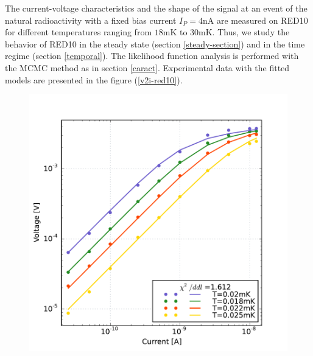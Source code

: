 The current-voltage characteristics and the shape of the signal at an event of the natural radioactivity with a fixed bias current $I_P=4$nA are measured on RED10 for different temperatures ranging from $18$mK to $30$mK. Thus, we study the behavior of RED10 in the steady state (section \ref{steady-section}) and in the time regime (section \ref{temporal}).
The likelihood function analysis is performed with the MCMC method as in section \ref{caract}. Experimental data with the fitted models are presented in the figure (\ref{v2i-red10}).

\begin{figure}[!ht]
\begin{minipage}{0.49\textwidth}
\includegraphics[width=\textwidth]{Images/v2i_red10.pdf}
\end{minipage}
\hfill
\begin{minipage}{0.49\textwidth}

\end{minipage}
\end{figure}
